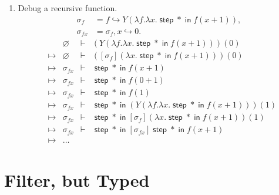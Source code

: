 \documentclass{article}
\newcommand{\hooksto}{\mathrel{\mathop{\hookrightarrow}}}
\newcommand{\entails}{\mathrel{\mathop{\vdash}}}
\DeclareMathOperator{\fstep}{\mathsf{step}}
\newcommand{\fin}{\mathrel{\mathop{\mathsf{in}}}}
\begin{document}
\begin{enumerate}
  \item Debug a recursive function.
    \begin{align*}
      \sigma_f &= f \hooksto Y (\lambda f . \lambda x . \fstep \ast \fin
      f(x + 1)),\\
      \sigma_{fx} &= \sigma_f, x \hooksto 0.
    \end{align*}
    \[
      \begin{array}{lcrcl}
        & & \varnothing &\entails& (Y (\lambda f . \lambda x . \fstep \ast \fin f(x + 1))) (0) \\
        &\mapsto& \varnothing &\entails& ([\sigma_f] (\lambda x . \fstep \ast \fin f(x + 1))) (0) \\
        &\mapsto& \sigma_{fx} &\entails& \fstep \ast \fin f(x + 1) \\
        &\mapsto& \sigma_{fx} &\entails& \fstep \ast \fin f(0 + 1) \\
        &\mapsto& \sigma_{fx} &\entails& \fstep \ast \fin f(1)\\
        &\mapsto& \sigma_{fx} &\entails&
        \fstep \ast \fin (Y (\lambda f . \lambda x . \fstep \ast \fin f(x + 1))) (1) \\
        &\mapsto& \sigma_{fx} &\entails&
        \fstep \ast \fin [\sigma_f] (\lambda x . \fstep \ast \fin f(x + 1)) (1) \\
        &\mapsto& \sigma_{fx} &\entails&
        \fstep \ast \fin [\sigma_{fx}] \fstep \ast \fin f(x + 1) \\
        &\mapsto& \ldots
      \end{array}
    \]
\end{enumerate}

\section{Filter, but Typed}
\end{document}
